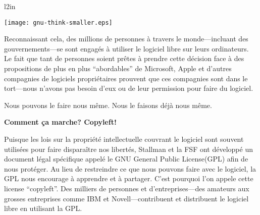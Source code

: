 \documentclass[12pt]{article}
\begin{document}

\begin{wrapfigure}[11]{l}{2in}
  \vspace{-0.25in}
  \begin{center}
    \texttt{[image: gnu-think-smaller.eps]}
  \end{center}
\end{wrapfigure}

Reconnaissant cela, des millions de personnes à travers le monde---incluant des
gouvernements---se sont engagés à utiliser le logiciel libre sur leurs
ordinateurs. Le fait que tant de personnes soient prêtes à prendre cette
décision face à des propositions de plus en plus ``abordables'' de Microsoft,
Apple et d'autres compagnies de logiciels propriétaires prouvent que ces
compagnies sont dans le tort---nous n'avons pas besoin d'eux ou de leur
permission pour faire du logiciel.


Nous pouvons le faire nous même. Nous le faisons déjà nous même.


\begin{center}
{\Large\bf Comment ça marche? Copyleft!}
\end{center}

Puisque les lois sur la propriété intellectuelle couvrant le logiciel sont
souvent utilisées pour faire disparaître nos libertés, Stallman et la FSF ont
développé un document légal spécifique appelé le GNU General Public
License(GPL) afin de nous protéger. Au lieu de restreindre ce que nous pouvons
faire avec le logiciel, la GPL nous encourage à apprendre et à partager. C'est
pourquoi l'on appele cette license ``copyleft''. Des milliers de personnes et
d'entreprises---des amateurs aux grosses entreprises comme IBM et
Novell---contribuent et distribuent le logiciel libre en utilisant la GPL.
\end{document}

